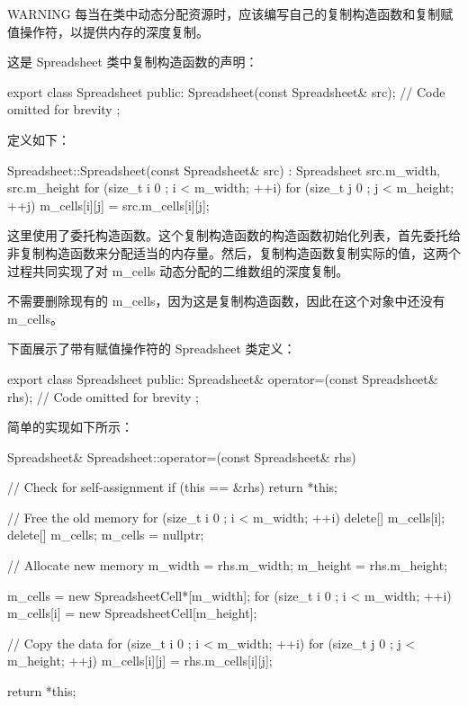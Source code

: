 \begin{myWarning}{WARNING}
每当在类中动态分配资源时，应该编写自己的复制构造函数和复制赋值操作符，以提供内存的深度复制。
\end{myWarning}


这是 Spreadsheet 类中复制构造函数的声明：

\begin{cpp}
export class Spreadsheet
{
    public:
        Spreadsheet(const Spreadsheet& src);
        // Code omitted for brevity
};
\end{cpp}

定义如下：

\begin{cpp}
Spreadsheet::Spreadsheet(const Spreadsheet& src)
    : Spreadsheet { src.m_width, src.m_height }
{
    for (size_t i { 0 }; i < m_width; ++i) {
        for (size_t j { 0 }; j < m_height; ++j) {
            m_cells[i][j] = src.m_cells[i][j];
        }
    }
}
\end{cpp}

这里使用了委托构造函数。这个复制构造函数的构造函数初始化列表，首先委托给非复制构造函数来分配适当的内存量。然后，复制构造函数复制实际的值，这两个过程共同实现了对 m\_cells 动态分配的二维数组的深度复制。

不需要删除现有的 m\_cells，因为这是复制构造函数，因此在这个对象中还没有m\_cells。


下面展示了带有赋值操作符的 Spreadsheet 类定义：

\begin{cpp}
export class Spreadsheet
{
    public:
        Spreadsheet& operator=(const Spreadsheet& rhs);
        // Code omitted for brevity
};
\end{cpp}

简单的实现如下所示：

\begin{cpp}
Spreadsheet& Spreadsheet::operator=(const Spreadsheet& rhs)
{
    // Check for self-assignment
    if (this == &rhs) {
        return *this;
    }

    // Free the old memory
    for (size_t i { 0 }; i < m_width; ++i) {
        delete[] m_cells[i];
    }
    delete[] m_cells;
    m_cells = nullptr;

    // Allocate new memory
    m_width = rhs.m_width;
    m_height = rhs.m_height;

    m_cells = new SpreadsheetCell*[m_width];
    for (size_t i { 0 }; i < m_width; ++i) {
        m_cells[i] = new SpreadsheetCell[m_height];
    }

    // Copy the data
    for (size_t i { 0 }; i < m_width; ++i) {
        for (size_t j { 0 }; j < m_height; ++j) {
            m_cells[i][j] = rhs.m_cells[i][j];
        }
    }

    return *this;
}
\end{cpp}

